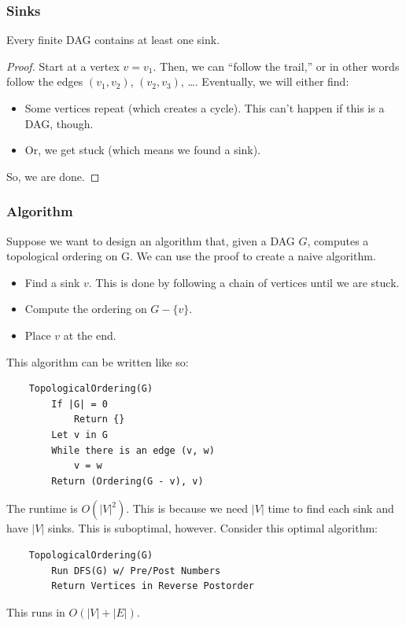 \documentclass[letterpaper]{article}
\begin{document}
\subsubsection{Sinks}
\begin{lemma}{}{}
    Every finite DAG contains at least one sink. 
\end{lemma}

\begin{mdframed}[]
    \begin{proof}
        Start at a vertex $v = v_1$. Then, we can ``follow the trail,'' or in other words follow the edges $(v_1, v_2)$, $(v_2, v_3)$, \dots. Eventually, we will either find: 
        \begin{itemize}
            \item Some vertices repeat (which creates a cycle). This can't happen if this is a DAG, though. 
            \item Or, we get stuck (which means we found a sink).
        \end{itemize}
        So, we are done. 
    \end{proof}
\end{mdframed}

\subsubsection{Algorithm}
Suppose we want to design an algorithm that, given a DAG $G$, computes a topological ordering on G. We can use the proof to create a naive algorithm. 
\begin{itemize}
    \item Find a sink $v$. This is done by following a chain of vertices until we are stuck.
    \item Compute the ordering on $G - \{v\}$.
    \item Place $v$ at the end. 
\end{itemize}
This algorithm can be written like so: 
\begin{verbatim}
    TopologicalOrdering(G)
        If |G| = 0
            Return {}
        Let v in G 
        While there is an edge (v, w)
            v = w
        Return (Ordering(G - v), v)
\end{verbatim}
The runtime is $O(|V|^2)$. This is because we need $|V|$ time to find each sink and have $|V|$ sinks. This is suboptimal, however. Consider this optimal algorithm:
\begin{verbatim}
    TopologicalOrdering(G)
        Run DFS(G) w/ Pre/Post Numbers 
        Return Vertices in Reverse Postorder
\end{verbatim}
This runs in $O(|V| + |E|)$.
\end{document}
